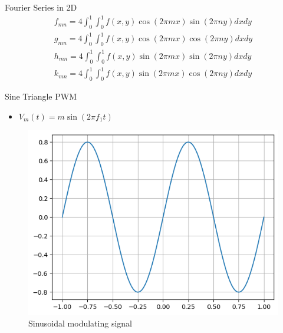 \documentclass{beamer}
\begin{document}
\begin{frame}{Fourier Series in 2D}
\begin{align*}
    f_{mn}=4\int_{0}^{1}\int_{0}^{1}f(x,y)\cos(2 \pi mx)\sin(2\pi ny)dxdy\\
    g_{mn}=4\int_{0}^{1}\int_{0}^{1}f(x,y)\cos(2 \pi mx)\cos(2\pi ny)dxdy\\
    h_{mn}=4\int_{0}^{1}\int_{0}^{1}f(x,y)\sin(2 \pi mx)\sin(2\pi ny)dxdy\\
    k_{mn}=4\int_{0}^{1}\int_{0}^{1}f(x,y)\sin(2 \pi mx)\cos(2\pi ny)dxdy
\end{align*}
\end{frame}

\begin{frame}{Sine Triangle PWM}
    \begin{itemize}
        \item $V_m(t) = m\sin(2\pi f_1t)$    
    \end{itemize}
    \begin{figure}
        \centering
        \includegraphics[width= 0.8\linewidth]{sine_wave.png}
        \caption{Sinusoidal modulating signal}
    \end{figure}
\end{frame}
\end{document}
